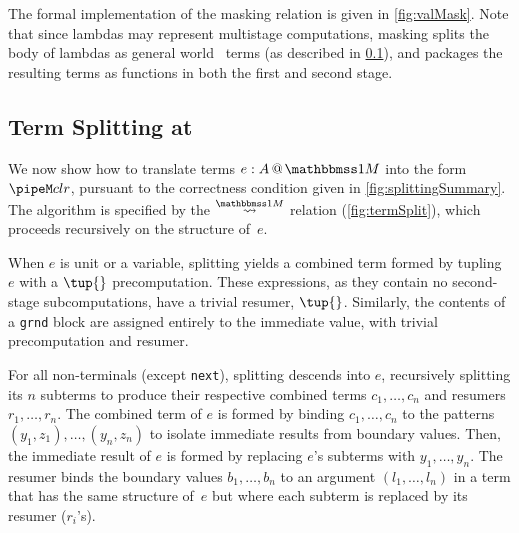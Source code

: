 \begin{abstrsyn}
The formal implementation of the masking relation is given in \ref{fig:valMask}.
Note that since lambdas may represent multistage computations, 
masking splits the body of lambdas as general world \bbonem\ terms (as described in \ref{sec:split-one}), 
and packages the resulting terms as functions in both the first and second stage.



\subsection{Term Splitting at \bbonem}
\label{sec:split-one}

We now show how to translate terms $\colmix e A$ into the form $\pipeM c l r$,
pursuant to the correctness condition given in \ref{fig:splittingSummary}.
The algorithm is specified by the $\splitonesym$ relation (\cref{fig:termSplit}), 
which proceeds recursively on the structure of~$e$.

When $e$ is unit or a variable,
splitting yields a combined term formed by tupling $e$ with a $\tup{}$ precomputation.
These expressions, as they contain no second-stage subcomputations, have a trivial resumer, $\tup{}$.
Similarly, the contents of a \texttt{grnd} block are assigned entirely to the immediate value,
with trivial precomputation and resumer.

For all non-terminals (except \texttt{next}),
splitting descends into $e$, recursively splitting its $n$ subterms
to produce their respective combined terms $c_1,\ldots,c_n$ and resumers $r_1, \ldots, r_n$.
The combined term of $e$ is formed by binding $c_1,\ldots,c_n$
to the patterns $(y_1,z_1),\ldots,(y_n,z_n)$
to isolate immediate results from boundary values. Then,
the immediate result of $e$ is formed by replacing $e$'s subterms with $y_1,\ldots,y_n$.
The resumer binds the boundary values $b_1,\ldots,b_n$ to an
argument $(l_1,\ldots,l_n)$ in a term that has the same structure
of~$e$ but where each subterm is replaced by its resumer ($r_i$'s).


\end{abstrsyn}
